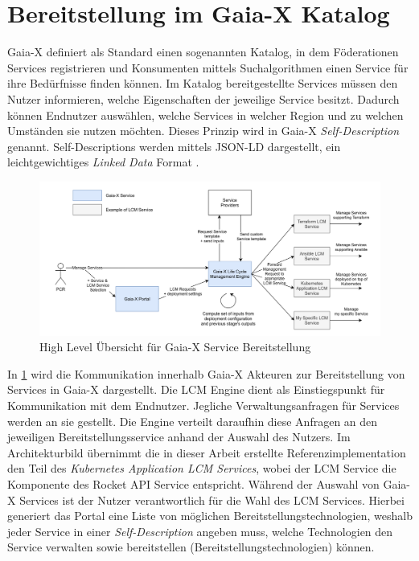 \section{Bereitstellung im Gaia-X Katalog}
\label{sec:gaia-x-einbettung:gaia-x-katalog}
Gaia-X definiert als Standard einen sogenannten Katalog, in dem Föderationen Services registrieren
und Konsumenten mittels Suchalgorithmen einen Service für ihre Bedürfnisse finden können.
Im Katalog bereitgestellte Services müssen den Nutzer informieren, welche Eigenschaften der jeweilige Service besitzt.
Dadurch können Endnutzer auswählen, welche Services in welcher Region und zu welchen Umständen sie nutzen möchten.
Dieses Prinzip wird in Gaia-X \emph{Self-Description} genannt. 
Self-Descriptions werden mittels JSON-LD dargestellt, ein
leichtgewichtiges \emph{Linked Data} Format \cite{Eggers2020}.


\begin{figure}
  \centering
  \includegraphics[width=\textwidth]{gfx/chapters/4_gaia-X/orchestration_overview.png}
  \caption{High Level Übersicht für Gaia-X Service Bereitstellung}
  \label{fig:gaia-x-orchestration-overview}
\end{figure}

In \ref{fig:gaia-x-orchestration-overview} wird die Kommunikation innerhalb Gaia-X Akteuren
zur Bereitstellung von Services in Gaia-X dargestellt.
Die \ac{LCM} Engine dient als Einstiegspunkt für Kommunikation mit dem Endnutzer. Jegliche Verwaltungsanfragen
für Services werden an sie gestellt. Die Engine verteilt daraufhin diese Anfragen
an den jeweiligen Bereitstellungsservice anhand der Auswahl des Nutzers.
Im Architekturbild übernimmt die in dieser Arbeit erstellte Referenzimplementation
den Teil des \emph{Kubernetes Application LCM Services}, wobei der \ac{LCM} Service die
Komponente des Rocket API Service entspricht.
Während der Auswahl von Gaia-X Services ist der Nutzer verantwortlich für die Wahl des \ac{LCM} Services.
Hierbei generiert das Portal eine Liste von möglichen Bereitstellungstechnologien,
weshalb jeder Service in einer \emph{Self-Description} angeben muss, welche Technologien den Service
verwalten sowie bereitstellen (Bereitstellungstechnologien) können.

